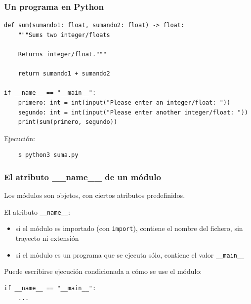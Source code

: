 \begin{frame}[fragile]
\frametitle{Un programa en Python}

\begin{footnotesize}
\begin{verbatim}
def sum(sumando1: float, sumando2: float) -> float:
    """Sums two integer/floats

    Returns integer/float."""

    return sumando1 + sumando2

if __name__ == "__main__":
    primero: int = int(input("Please enter an integer/float: "))
    segundo: int = int(input("Please enter another integer/float: "))
    print(sum(primero, segundo))

\end{verbatim}
\end{footnotesize}

Ejecución:
\begin{footnotesize}
\begin{verbatim}
    $ python3 suma.py
\end{verbatim}
\end{footnotesize}
 
\end{frame}



\begin{frame}[fragile]
\frametitle{El atributo \_\_name\_\_ de un módulo}

Los módulos son objetos, con ciertos atributos predefinidos.

El atributo \verb|__name__|:
\begin{itemize}
\item si el módulo es importado (con \verb|import|), contiene el
  nombre del fichero, sin trayecto ni extensión
\item si el módulo es un programa que se ejecuta sólo, contiene el
  valor \verb|__main__|
\end{itemize}

Puede escribirse ejecución condicionada a cómo se use el módulo:
\begin{footnotesize}
\begin{verbatim}
if __name__ == "__main__": 
    ...
\end{verbatim}
\end{footnotesize}
  
\end{frame}



